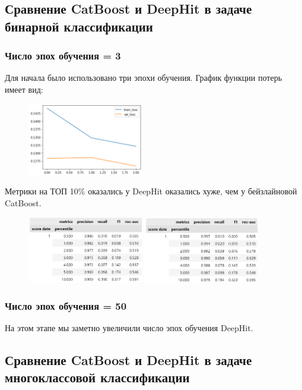 \documentclass{article}
\begin{document}
\subsection{Сравнение CatBoost и DeepHit в задаче бинарной классификации}



\subsubsection{Число эпох обучения = 3}

Для начала было использовано три эпохи обучения. График функции потерь имеет вид:

\begin{figure}[h!]
	\includegraphics[width=0.45\textwidth]{../figures/deephit_losses_3_epoch.png}
\end{figure}

Метрики на ТОП 10\% оказались у DeepHit оказались хуже, чем у бейзлайновой CatBoost.

\begin{figure}[h!]
	\includegraphics[width=0.45\textwidth]{../figures/deephit_reports_3_epoch.png}
	\includegraphics[width=0.45\textwidth]{../figures/catboost_reports.png}
\end{figure}

\subsubsection{Число эпох обучения = 50}

На этом этапе мы заметно увеличили число эпох обучения DeepHit. 


\subsection{Сравнение CatBoost и DeepHit в задаче многоклассовой классификации}


\nocite{*}

\end{document}
